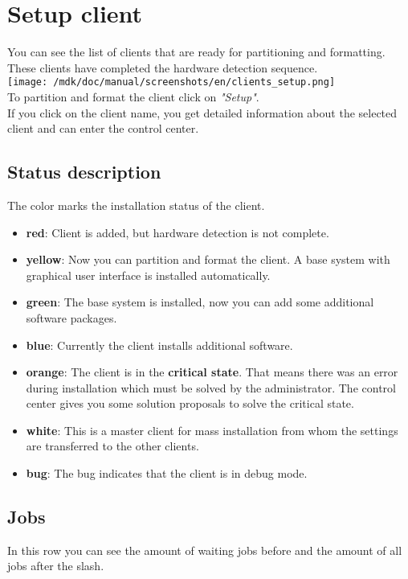 \section{Setup client}You can see the list of clients that are ready for partitioning and formatting. These clients have completed the hardware detection sequence.\\
\texttt{[image: /mdk/doc/manual/screenshots/en/clients\_setup.png]} \\
To partition and format the client click on \textit{"Setup"}.\\
If you click on the client name, you get detailed information about the selected client and can enter the control center.\\
\subsection{Status description}
The color marks the installation status of the client.\\
\begin{itemize}
\item \textbf{red}: Client is added, but hardware detection is not complete.\\
\item \textbf{yellow}: Now you can partition and format the client. A base system with graphical user interface is installed automatically.\\
\item \textbf{green}: The base system is installed, now you can add some additional software packages.\\
\item \textbf{blue}: Currently the client installs additional software.\\
\item \textbf{orange}: The client is in the \textbf{critical state}. That means there was an error during installation which must be solved by the administrator. The control center gives you some solution proposals to solve the critical state.\\
\item \textbf{white}: This is a master client for mass installation from whom the settings are transferred to the other clients.\\
\item \textbf{bug}: The bug indicates that the client is in debug mode.\\
\end{itemize}
\subsection{Jobs}
In this row you can see the amount of waiting jobs before and the amount of all jobs after the slash.\\
